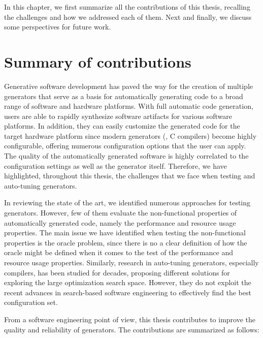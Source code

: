 In this chapter, we first summarize all the contributions of this thesis, recalling the challenges and how we addressed each of them. Next and finally, we discuss some perspectives for future work.

\section{Summary of contributions}
Generative software development has paved the way for the creation of multiple generators that serve as a basis for automatically generating code to a broad range of software and hardware platforms. With full automatic code generation, users are able to rapidly synthesize software artifacts for various software platforms. In addition, they can easily customize the generated code for the target hardware platform since modern generators (\ie, C compilers) become highly configurable, offering numerous configuration options that the user can apply. 
The quality of the automatically generated software is highly correlated to the configuration settings as well as the generator itself.
Therefore, we have highlighted, throughout this thesis, the challenges that we face when testing and auto-tuning generators. 

In reviewing the state of the art, we identified numerous approaches for testing generators. However, few of them evaluate the non-functional properties of automatically generated code, namely the performance and resource usage properties. The main issue we have identified when testing the non-functional properties is the oracle problem, since there is no a clear definition of how the oracle might be defined when it comes to the test of the performance and resource usage properties. Similarly, research in auto-tuning generators, especially compilers, has been studied for decades, proposing different solutions for exploring the large optimization search space. However, they  do not exploit the recent advances in search-based software engineering to effectively find the best configuration set. 
 

From a software engineering point of view, this thesis contributes to improve the quality and reliability of generators. The contributions are summarized as follows: 

